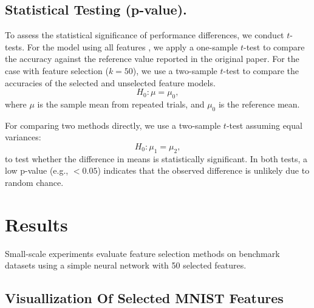 \documentclass[a4paper,twocolumn]{article} %
\begin{document}
\subsection{Statistical Testing (p-value).}
To assess the statistical significance of performance differences, we conduct $t$-tests. For the model using all features , we apply a one-sample $t$-test to compare the accuracy against the reference value reported in the original paper. For the case with feature selection ($k=50$), we use a two-sample $t$-test to compare the accuracies of the selected and unselected feature models.
\begin{equation}
    H_0: \mu = \mu_0,
\end{equation}
where $\mu$ is the sample mean from repeated trials, and $\mu_0$ is the reference mean.

For comparing two methods directly, we use a two-sample $t$-test assuming equal variances:
\begin{equation}
    H_0: \mu_1 = \mu_2,
\end{equation}
to test whether the difference in means is statistically significant. In both tests, a low p-value (e.g., $< 0.05$) indicates that the observed difference is unlikely due to random chance.

\section{Results}
Small-scale experiments evaluate feature selection methods on benchmark datasets using a simple neural network with 50 selected features.
\subsection{Visuallization Of Selected MNIST Features}
\end{document}

